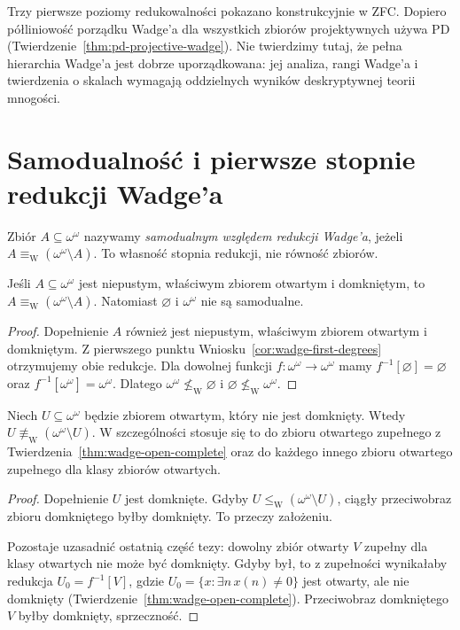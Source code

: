 \begin{uwaga}
Trzy pierwsze poziomy redukowalności pokazano
konstrukcyjnie w ZFC. Dopiero półliniowość
porządku Wadge'a dla wszystkich zbiorów
projektywnych używa PD
(Twierdzenie~\ref{thm:pd-projective-wadge}).
Nie twierdzimy tutaj, że pełna hierarchia Wadge'a
jest dobrze uporządkowana: jej analiza, rangi
Wadge'a i twierdzenia o skalach wymagają
oddzielnych wyników deskryptywnej teorii mnogości.
\end{uwaga}


\section{Samodualność i pierwsze stopnie redukcji Wadge'a}
\label{sec:wadge-selfduality-clopen}
Zbiór $A\subseteq\omega^\omega$ nazywamy \emph{samodualnym względem redukcji Wadge'a}, jeżeli $A\equiv_{\mathrm W}(\omega^\omega\setminus A)$.
To własność stopnia redukcji, nie równość zbiorów.

\begin{twierdzenie}
\label{thm:wadge-clopen-selfdual}
Jeśli $A\subseteq\omega^\omega$ jest niepustym, właściwym zbiorem otwartym i domkniętym, to $A\equiv_{\mathrm W}(\omega^\omega\setminus A)$.
Natomiast $\varnothing$ i $\omega^\omega$ nie są samodualne.
\end{twierdzenie}
\begin{proof}
Dopełnienie $A$ również jest niepustym, właściwym zbiorem otwartym i domkniętym. Z pierwszego punktu Wniosku~\ref{cor:wadge-first-degrees} otrzymujemy obie redukcje.
Dla dowolnej funkcji $f:\omega^\omega\to\omega^\omega$ mamy $f^{-1}[\varnothing]=\varnothing$ oraz $f^{-1}[\omega^\omega]=\omega^\omega$. Dlatego $\omega^\omega\not\leq_{\mathrm W}\varnothing$ i $\varnothing\not\leq_{\mathrm W}\omega^\omega$.
\end{proof}

\begin{twierdzenie}
\label{thm:wadge-open-nonselfdual}
Niech $U\subseteq\omega^\omega$ będzie zbiorem
otwartym, który nie jest domknięty.
Wtedy
$U\not\equiv_{\mathrm W}(\omega^\omega\setminus U)$.
W szczególności stosuje się to
do zbioru otwartego zupełnego
z Twierdzenia~\ref{thm:wadge-open-complete}
oraz do każdego innego zbioru
otwartego zupełnego dla klasy zbiorów otwartych.
\end{twierdzenie}
\begin{proof}
Dopełnienie $U$ jest domknięte.
Gdyby
$U\leq_{\mathrm W}(\omega^\omega\setminus U)$,
ciągły przeciwobraz zbioru domkniętego
byłby domknięty. To przeczy założeniu.

Pozostaje uzasadnić ostatnią część tezy:
dowolny zbiór otwarty $V$
zupełny dla klasy otwartych
nie może być domknięty.
Gdyby był, to z zupełności
wynikałaby redukcja
$U_0=f^{-1}[V]$, gdzie
$U_0=\{x:\exists n\,x(n)\ne0\}$
jest otwarty, ale nie domknięty
(Twierdzenie~\ref{thm:wadge-open-complete}).
Przeciwobraz domkniętego $V$
byłby domknięty, sprzeczność.
\end{proof}

